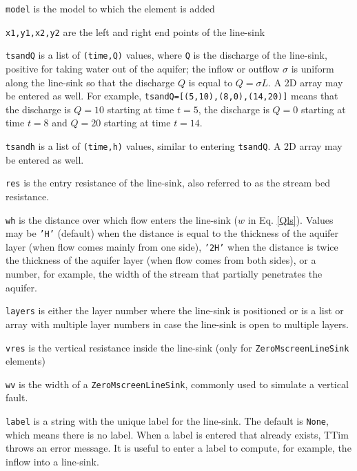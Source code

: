 \documentclass [10pt,letterpaper] {article}
\begin{document}
\begin{description}
    \item {\tt model} is the model to which the element is
    added
    \item {\tt x1,y1,x2,y2} are the left and right end points of
    the line-sink
    \item {\tt tsandQ} is a list of {\tt (time,Q)} values, where {\tt Q} is the discharge of the line-sink, positive for taking water out of the aquifer; the inflow or outflow $\sigma$ is uniform along the line-sink so that the discharge $Q$ is equal to $Q=\sigma L$. A 2D array may be entered as well. For example, {\tt tsandQ=[(5,10),(8,0),(14,20)]} means that the discharge is $Q=10$ starting at time $t=5$, the discharge is $Q=0$ starting at time $t=8$ and $Q=20$ starting at time $t=14$.
    \item {\tt tsandh} is a list of {\tt (time,h)} values, similar to entering {\tt tsandQ}. A 2D array may be entered as well.    
    \item {\tt res} is the entry resistance of the line-sink, also referred to as the stream bed resistance.
    \item {\tt wh} is the distance over which flow enters the line-sink ($w$ in Eq. \ref{Qls}). Values may be {\tt 'H'} (default) when the distance is equal to the thickness of the aquifer layer (when flow comes mainly from one side), {\tt '2H'} when the distance is twice the thickness of the aquifer layer (when flow comes from both sides), or a number, for example, the width of the stream that partially penetrates the aquifer.
    \item {\tt layers} is either the layer number where the line-sink is positioned or is a list or array with
    multiple layer numbers in case the line-sink is open to multiple layers.
    \item {\tt vres} is the vertical resistance inside the line-sink (only for {\tt ZeroMscreenLineSink} elements)    
    \item {\tt wv} is the width of a {\tt ZeroMscreenLineSink}, commonly used to simulate a vertical fault. 
    \item {\tt label} is a string with the unique label for the line-sink. The default is {\tt None}, which means there is no label. When a label is entered that already exists, TTim throws an error message. It is useful to enter a label to compute, for example, the inflow into a line-sink.
\end{description}
\end{document}
